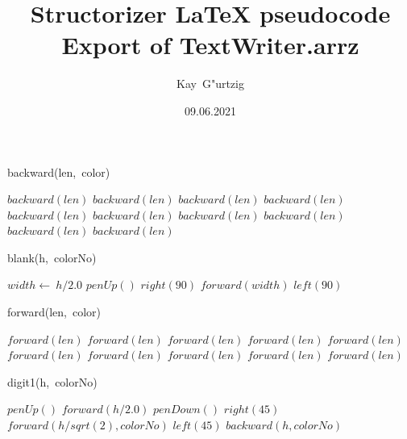 \documentclass[a4paper,10pt]{article}
\title{Structorizer LaTeX pseudocode Export of TextWriter.arrz}
\author{Kay\ G"urtzig}
\date{09.06.2021}
\begin{document}
\begin{algorithm}
\caption{backward(len,\ color)}
\begin{algorithmic}[5]

    \STATE \(backward(len)\)
    \STATE \(backward(len)\)
    \STATE \(backward(len)\)
    \STATE \(backward(len)\)
    \STATE \(backward(len)\)
    \STATE \(backward(len)\)
    \STATE \(backward(len)\)
    \STATE \(backward(len)\)
    \STATE \(backward(len)\)
    \STATE \(backward(len)\)
  \ENDIF

\end{algorithmic}
\end{algorithm}


\begin{algorithm}
\caption{blank(h,\ colorNo)}
\begin{algorithmic}[5]

\STATE {}
  \STATE \(width\gets\ h/2.0\)
  \STATE \(penUp()\)
  \STATE \(right(90)\)
  \STATE \(forward(width)\)
  \STATE \(left(90)\)

\end{algorithmic}
\end{algorithm}


\begin{algorithm}
\caption{forward(len,\ color)}
\begin{algorithmic}[5]

    \STATE \(forward(len)\)
    \STATE \(forward(len)\)
    \STATE \(forward(len)\)
    \STATE \(forward(len)\)
    \STATE \(forward(len)\)
    \STATE \(forward(len)\)
    \STATE \(forward(len)\)
    \STATE \(forward(len)\)
    \STATE \(forward(len)\)
    \STATE \(forward(len)\)
  \ENDIF

\end{algorithmic}
\end{algorithm}


\begin{algorithm}
\caption{digit1(h,\ colorNo)}
\begin{algorithmic}[5]

\STATE {}
\STATE {}
  \STATE \(penUp()\)
  \STATE \(forward(h/2.0)\)
  \STATE \(penDown()\)
  \STATE \(right(45)\)
  \STATE \(forward(h/sqrt(2),colorNo)\)
  \STATE \(left(45)\)
  \STATE \(backward(h,colorNo)\)

\end{algorithmic}
\end{algorithm}
\end{document}
